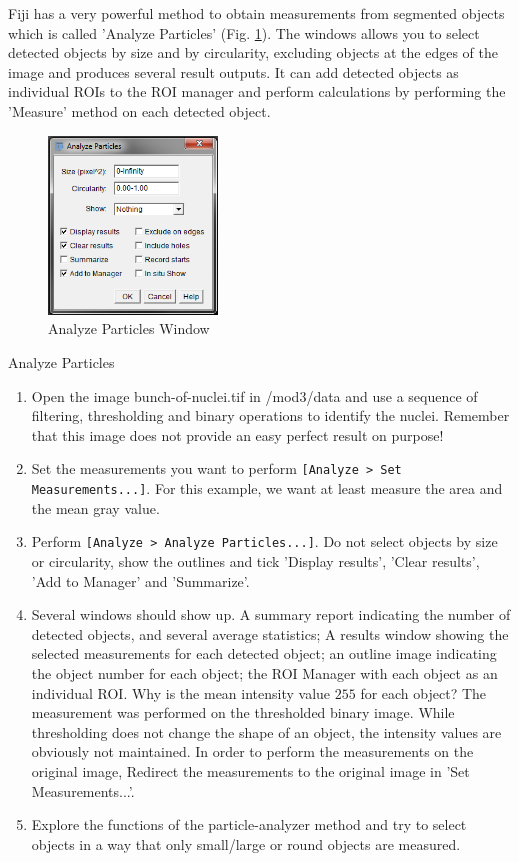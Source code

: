 Fiji has a very powerful method to obtain measurements from segmented objects which is called 'Analyze Particles' (Fig. \ref{fig:analyze-particles-dialog}). The windows allows you to select detected objects by size and by circularity, excluding objects at the edges of the image and produces several result outputs. It can add detected objects as individual ROIs to the ROI manager and perform calculations by performing the 'Measure' method on each detected object.

\begin{figure}[!ht]
	\centering
		\includegraphics[width=0.40\textwidth]{mod3/figures/analyze-particles-dialog.png}
	\caption{Analyze Particles Window}
	\label{fig:analyze-particles-dialog}
\end{figure}

\begin{taskbox}{Analyze Particles}
\begin{enumerate}
	\item Open the image bunch-of-nuclei.tif in /mod3/data and use a sequence of filtering, thresholding and binary operations to identify the nuclei. Remember that this image does not provide an easy perfect result on purpose!
	\item Set the measurements you want to perform \texttt{[Analyze > Set Measurements...]}. For this example, we want at least measure the area and the mean gray value. 
	\item Perform \texttt{[Analyze > Analyze Particles...]}. Do not select objects by size or circularity, show the outlines and tick 'Display results', 'Clear results', 'Add to Manager' and 'Summarize'.
	\item Several windows should show up. A summary report indicating the number of detected objects, and several average statistics; A results window showing the selected measurements for each detected object; an outline image indicating the object number for each object; the ROI Manager with each object as an individual ROI. Why is the mean intensity value $255$ for each object? The measurement was performed on the thresholded binary image. While thresholding does not change the shape of an object, the intensity values are obviously not maintained. In order to perform the measurements on the original image, Redirect the measurements to the original image in 'Set Measurements...'.
	\item Explore the functions of the particle-analyzer method and try to select objects in a way that only small/large or round objects are measured.
	\end{enumerate}
\end{taskbox}

